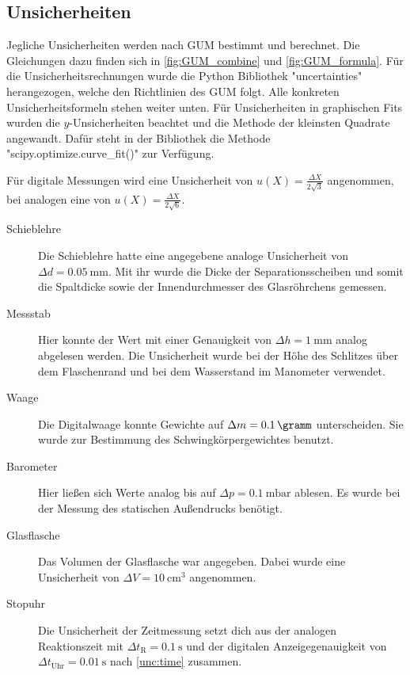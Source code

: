 \subsection{Unsicherheiten}\label{VGuD}

Jegliche Unsicherheiten werden nach GUM bestimmt und berechnet.
Die Gleichungen dazu finden sich in \ref{fig:GUM_combine} und \ref{fig:GUM_formula}.
Für die Unsicherheitsrechnungen wurde die Python Bibliothek "uncertainties" herangezogen, welche den Richtlinien des GUM folgt.
Alle konkreten Unsicherheitsformeln stehen weiter unten.
Für Unsicherheiten in graphischen Fits wurden die $y$-Unsicherheiten beachtet und die Methode der kleinsten Quadrate angewandt.
Dafür steht in der Bibliothek die Methode "scipy.optimize.curve_fit()" zur Verfügung.


Für digitale Messungen wird eine Unsicherheit von $u(X) = \frac{\Delta X}{2\sqrt{3}}$ angenommen, bei analogen eine von $u(X) = \frac{\Delta X}{2\sqrt{6}}$.

\begin{description}
	\item[Schieblehre] Die Schieblehre hatte eine angegebene analoge Unsicherheit von $\Delta d = \SI{0.05}{\milli\meter}$.
	Mit ihr wurde die Dicke der Separationsscheiben und somit die Spaltdicke sowie der Innendurchmesser des Glasröhrchens gemessen.
		
	\item[Messstab] Hier konnte der Wert mit einer Genauigkeit von $\Delta h = \SI{1}{\milli\meter}$ analog abgelesen werden.
	Die Unsicherheit wurde bei der Höhe des Schlitzes über dem Flaschenrand und bei dem Wasserstand im Manometer verwendet.
	
	\item[Waage] Die Digitalwaage konnte Gewichte auf $\Delta m = \SI{0.1}{\gramm}$ unterscheiden.
	Sie wurde zur Bestimmung des Schwingkörpergewichtes benutzt.
	
	\item[Barometer] Hier ließen sich Werte analog bis auf $\Delta p = \SI{0.1}{\milli\bar}$ ablesen.
	Es wurde bei der Messung des statischen Außendrucks benötigt.
	
	\item[Glasflasche] Das Volumen der Glasflasche war angegeben.
	Dabei wurde eine Unsicherheit von $\Delta V = \SI{10}{\centi\meter\cubed}$ angenommen.
	
	\item[Stopuhr] Die Unsicherheit der Zeitmessung setzt dich aus der analogen Reaktionszeit mit $\Delta t_\text{R} = \SI{0.1}{\second}$ und der digitalen Anzeigegenauigkeit von $\Delta t_\text{Uhr} = \SI{0.01}{\second}$ nach \ref{unc:time} zusammen.
		
\end{description}


